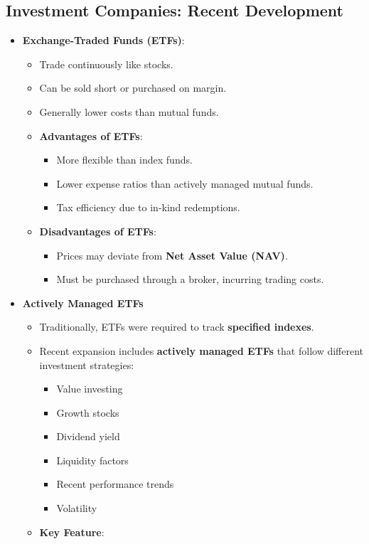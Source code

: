 \documentclass[
  letterpaper,
  DIV=11,
  numbers=noendperiod]{scrartcl}
\providecommand{\tightlist}{%
  \setlength{\itemsep}{0pt}\setlength{\parskip}{0pt}}\usepackage{longtable,booktabs,array}
\begin{document}
\subsection{Investment Companies: Recent
Development}\label{investment-companies-recent-development}

\begin{itemize}
\item
  \textbf{Exchange-Traded Funds (ETFs)}:

  \begin{itemize}
  \item
    Trade continuously like stocks.
  \item
    Can be sold short or purchased on margin.
  \item
    Generally lower costs than mutual funds.
  \item
    \textbf{Advantages of ETFs}:

    \begin{itemize}
    \tightlist
    \item
      More flexible than index funds.
    \item
      Lower expense ratios than actively managed mutual funds.
    \item
      Tax efficiency due to in-kind redemptions.
    \end{itemize}
  \item
    \textbf{Disadvantages of ETFs}:

    \begin{itemize}
    \tightlist
    \item
      Prices may deviate from \textbf{Net Asset Value (NAV)}.
    \item
      Must be purchased through a broker, incurring trading costs.
    \end{itemize}
  \end{itemize}
\item
  \textbf{Actively Managed ETFs}

  \begin{itemize}
  \item
    Traditionally, ETFs were required to track \textbf{specified
    indexes}.
  \item
    Recent expansion includes \textbf{actively managed ETFs} that follow
    different investment strategies:

    \begin{itemize}
    \tightlist
    \item
      Value investing
    \item
      Growth stocks
    \item
      Dividend yield
    \item
      Liquidity factors
    \item
      Recent performance trends
    \item
      Volatility
    \end{itemize}
  \item
    \textbf{Key Feature}:


\end{itemize}
\end{itemize}
\end{document}
